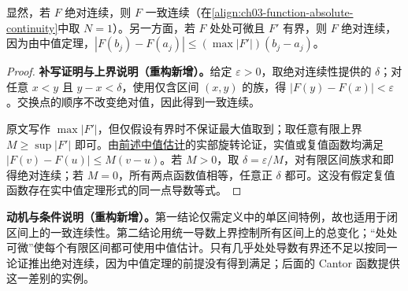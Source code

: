 \documentclass[../../main.tex]{subfiles}%
\begin{document}
\begin{proposition}\label{proposition:ch03-ac-basic-properties}
显然，若 $F$ 绝对连续，则 $F$ 一致连续（在\cref{align:ch03-function-absolute-continuity}中取 $N=1$）。另一方面，若 $F$ 处处可微且 $F'$ 有界，则 $F$ 绝对连续，因为由中值定理，$|F(b_j)-F(a_j)|\le(\max|F'|)(b_j-a_j)$。
\end{proposition}
\begin{proof}
\textbf{补写证明与上界说明（重构新增）。}给定 $\varepsilon>0$，取绝对连续性提供的 $\delta$；对任意 $x<y$ 且 $y-x<\delta$，使用仅含区间 $(x,y)$ 的族，得 $|F(y)-F(x)|<\varepsilon$。交换点的顺序不改变绝对值，因此得到一致连续。

原文写作 $\max|F'|$，但仅假设有界时不保证最大值取到；取任意有限上界 $M\ge\sup|F'|$ 即可。由\hyperref[item:ch03-bv-bounded-derivative]{前述中值估计}的实部旋转论证，实值或复值函数均满足 $|F(v)-F(u)|\le M(v-u)$。若 $M>0$，取 $\delta=\varepsilon/M$，对有限区间族求和即得绝对连续；若 $M=0$，所有两点函数值相等，任意正 $\delta$ 都可。这没有假定复值函数存在实中值定理形式的同一点导数等式。
\end{proof}
\begin{remark}
\textbf{动机与条件说明（重构新增）。}第一结论仅需定义中的单区间特例，故也适用于闭区间上的一致连续性。第二结论用统一导数上界控制所有区间上的总变化；“处处可微”使每个有限区间都可使用中值估计。只有几乎处处导数有界还不足以按同一论证推出绝对连续，因为中值定理的前提没有得到满足；后面的 Cantor 函数提供这一差别的实例。
\end{remark}
\end{document}
